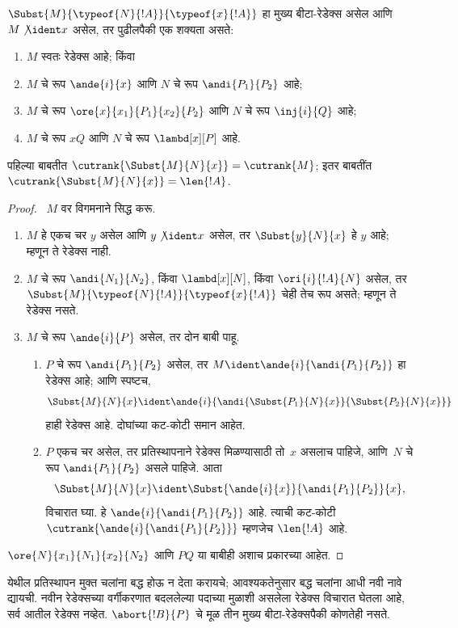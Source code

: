 \documentclass[../../../include/open-logic-section]{subfiles}
\begin{document}
\begin{lem}
  $\Subst{M}{\typeof{N}{!A}}{\typeof{x}{!A}}$ हा मुख्य बीटा-रेडेक्स असेल
  आणि $M \not\ident x$ असेल, तर पुढीलपैकी एक शक्यता असते:
  \begin{enumerate}
  \item $M$ स्वतः रेडेक्स आहे; किंवा
  \item $M$ चे रूप $\ande{i}{x}$ आणि $N$ चे रूप
    $\andi{P_1}{P_2}$ आहे;
  \item $M$ चे रूप $\ore{x}{x_1}{P_1}{x_2}{P_2}$ आणि $N$ चे
    रूप $\inj{i}{Q}$ आहे;
  \item $M$ चे रूप $x Q$ आणि $N$ चे रूप
    $\lambd[x][P]$ आहे.
  \end{enumerate}
  पहिल्या बाबतीत $\cutrank{\Subst{M}{N}{x}} = \cutrank{M}$;
  इतर बाबतींत $\cutrank{\Subst{M}{N}{x}} = \len{!A}$.
\end{lem}
\begin{proof}
  ~$M$ वर विगमनाने सिद्ध करू.
  \begin{enumerate}
  \item $M$ हे एकच चर $y$ असेल आणि $y \not\ident x$ असेल,
    तर $\Subst{y}{N}{x}$ हे $y$ आहे; म्हणून ते रेडेक्स नाही.
  \item $M$ चे रूप $\andi{N_1}{N_2}$, किंवा $\lambd[x][N]$,
    किंवा $\ori{i}{!A}{N}$ असेल, तर
    $\Subst{M}{\typeof{N}{!A}}{\typeof{x}{!A}}$ चेही तेच
    रूप असते; म्हणून ते रेडेक्स नसते.
  \item $M$ चे रूप $\ande{i}{P}$ असेल, तर दोन बाबी पाहू.
    \begin{enumerate}
      \item $P$ चे रूप $\andi{P_1}{P_2}$ असेल, तर
        $M \ident \ande{i}{\andi{P_1}{P_2}}$ हा रेडेक्स आहे;
        आणि स्पष्टच,
        \[
        \Subst{M}{N}{x} \ident
        \ande{i}{\andi{\Subst{P_1}{N}{x}}{\Subst{P_2}{N}{x}}}
        \]
        हाही रेडेक्स आहे. दोघांच्या कट-कोटी समान आहेत.
      \item $P$ एकच चर असेल, तर प्रतिस्थापनाने रेडेक्स
        मिळण्यासाठी तो~$x$ असलाच पाहिजे, आणि~$N$ चे रूप
        $\andi{P_1}{P_2}$ असले पाहिजे. आता
        \[
        \Subst{M}{N}{x} \ident \Subst{\ande{i}{x}}{\andi{P_1}{P_2}}{x},
        \]
        विचारात घ्या. हे $\ande{i}{\andi{P_1}{P_2}}$ आहे.
        त्याची कट-कोटी $\cutrank{\ande{i}{\andi{P_1}{P_2}}}$
        म्हणजेच $\len{!A}$ आहे.
    \end{enumerate}
  \end{enumerate}
  $\ore{N}{x_1}{N_1}{x_2}{N_2}$ आणि $P Q$ या बाबीही
  अशाच प्रकारच्या आहेत.
\end{proof}
येथील प्रतिस्थापन मुक्त चलांना बद्ध होऊ न देता करायचे;
आवश्यकतेनुसार बद्ध चलांना आधी नवी नावे द्यायची.
नवीन रेडेक्सच्या वर्गीकरणात बदललेल्या पदाच्या
मुळाशी असलेला रेडेक्स विचारात घेतला आहे, सर्व
आतील रेडेक्स नव्हेत. $\abort{!B}{P}$ चे मूळ
तीन मुख्य बीटा-रेडेक्सपैकी कोणतेही नसते.
\end{document}
